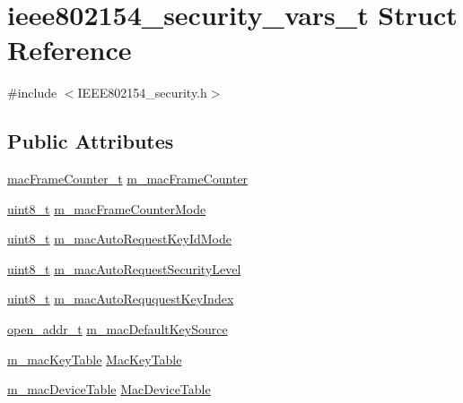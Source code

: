\hypertarget{structieee802154__security__vars__t}{}\section{ieee802154\+\_\+security\+\_\+vars\+\_\+t Struct Reference}
\label{structieee802154__security__vars__t}


{\ttfamily \#include $<$I\+E\+E\+E802154\+\_\+security.\+h$>$}

\subsection*{Public Attributes}
\begin{DoxyCompactItemize}
\item 
\hyperlink{opendefs_8h_af2fecf66c5a2c01ec313af8ce18bf4b9}{mac\+Frame\+Counter\+\_\+t} \hyperlink{structieee802154__security__vars__t_af9d07f6dfaec2372e30f8632d5d78051}{m\+\_\+mac\+Frame\+Counter}
\item 
\hyperlink{_p_e___types_8h_aba7bc1797add20fe3efdf37ced1182c5}{uint8\+\_\+t} \hyperlink{structieee802154__security__vars__t_a2ce81e87e039fa75cb54a21c64dd7cd5}{m\+\_\+mac\+Frame\+Counter\+Mode}
\item 
\hyperlink{_p_e___types_8h_aba7bc1797add20fe3efdf37ced1182c5}{uint8\+\_\+t} \hyperlink{structieee802154__security__vars__t_ae908932fa0b4262f18124b9c6a0fd5bd}{m\+\_\+mac\+Auto\+Request\+Key\+Id\+Mode}
\item 
\hyperlink{_p_e___types_8h_aba7bc1797add20fe3efdf37ced1182c5}{uint8\+\_\+t} \hyperlink{structieee802154__security__vars__t_a8aac24aa5b3c2d7c109902882d59b7c8}{m\+\_\+mac\+Auto\+Request\+Security\+Level}
\item 
\hyperlink{_p_e___types_8h_aba7bc1797add20fe3efdf37ced1182c5}{uint8\+\_\+t} \hyperlink{structieee802154__security__vars__t_a3d91f527a643e283d110850a1f0996ff}{m\+\_\+mac\+Auto\+Reququest\+Key\+Index}
\item 
\hyperlink{structopen__addr__t}{open\+\_\+addr\+\_\+t} \hyperlink{structieee802154__security__vars__t_a10216ed0aad7d9691d38957a5137d392}{m\+\_\+mac\+Default\+Key\+Source}
\item 
\hyperlink{structm__mac_key_table}{m\+\_\+mac\+Key\+Table} \hyperlink{structieee802154__security__vars__t_a302a3ae85313be8000b212803cba827c}{Mac\+Key\+Table}
\item 
\hyperlink{structm__mac_device_table}{m\+\_\+mac\+Device\+Table} \hyperlink{structieee802154__security__vars__t_ad758c7fe1ee093f110d065654014faca}{Mac\+Device\+Table}

\end{DoxyCompactItemize}
